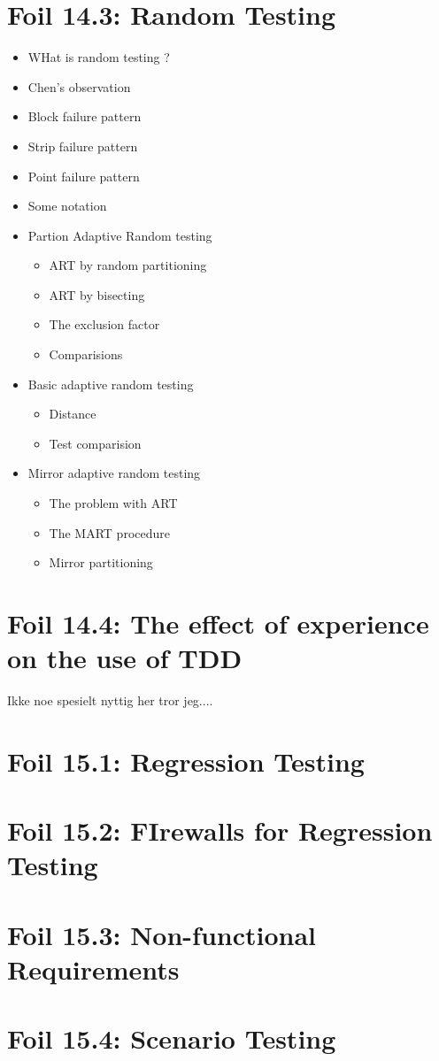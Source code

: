 	\section{Foil 14.3: Random Testing}
		\begin{itemize}
			\item WHat is random testing ?
			\item Chen's observation
			\item Block failure pattern
			\item Strip failure pattern
			\item Point failure pattern
			\item Some notation
			\item Partion Adaptive Random testing
				\begin{itemize}
					\item ART by random partitioning
					\item ART by bisecting
					\item The exclusion factor
					\item Comparisions
				\end{itemize}
			\item Basic adaptive random testing
				\begin{itemize}
					\item Distance
					\item Test comparision
				\end{itemize}
			\item Mirror adaptive random testing
				\begin{itemize}
					\item The problem with ART
					\item The MART procedure
					\item Mirror partitioning
				\end{itemize}
		\end{itemize}

	\section{Foil 14.4: The effect of experience on the use of TDD}
		Ikke noe spesielt nyttig her tror jeg....

	


	\section{Foil 15.1: Regression Testing}

	\section{Foil 15.2: FIrewalls for Regression Testing}

	\section{Foil 15.3: Non-functional Requirements}

	\section{Foil 15.4: Scenario Testing}